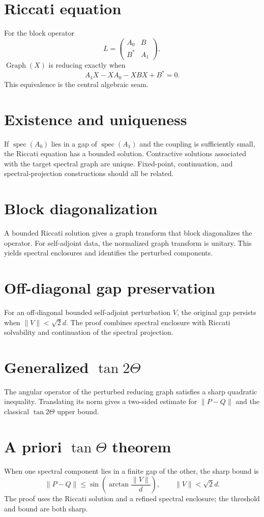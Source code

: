 \documentclass{article}
\newcommand{\spec}{\operatorname{spec}}
\newcommand{\Graph}{\operatorname{Graph}}
\begin{document}
\section{Riccati equation}
For the block operator
\[
 L=\begin{pmatrix}A_0&B\\B^*&A_1\end{pmatrix},
\]
$\Graph(X)$ is reducing exactly when
\[
 A_1X-XA_0-XBX+B^*=0.
\]
This equivalence is the central algebraic seam.

\section{Existence and uniqueness}
If $\spec(A_0)$ lies in a gap of $\spec(A_1)$ and the coupling is sufficiently
small, the Riccati equation has a bounded solution.  Contractive solutions
associated with the target spectral graph are unique.  Fixed-point,
continuation, and spectral-projection constructions should all be related.

\section{Block diagonalization}
A bounded Riccati solution gives a graph transform that block diagonalizes the
operator.  For self-adjoint data, the normalized graph transform is unitary.
This yields spectral enclosures and identifies the perturbed components.

\section{Off-diagonal gap preservation}
For an off-diagonal bounded self-adjoint perturbation $V$, the original gap
persists when $\|V\|<\sqrt2d$.  The proof combines spectral enclosure with
Riccati solvability and continuation of the spectral projection.

\section{Generalized $\tan 2\Theta$}
The angular operator of the perturbed reducing graph satisfies a sharp
quadratic inequality.  Translating its norm gives a two-sided estimate for
$\|P-Q\|$ and the classical $\tan 2\Theta$ upper bound.

\section{A priori $\tan\Theta$ theorem}
When one spectral component lies in a finite gap of the other, the sharp bound
is
\[
 \|P-Q\|\le \sin\!\left(\arctan\frac{\|V\|}{d}\right),
 \qquad \|V\|<\sqrt2d.
\]
The proof uses the Riccati solution and a refined spectral enclosure; the
threshold and bound are both sharp.
\end{document}

